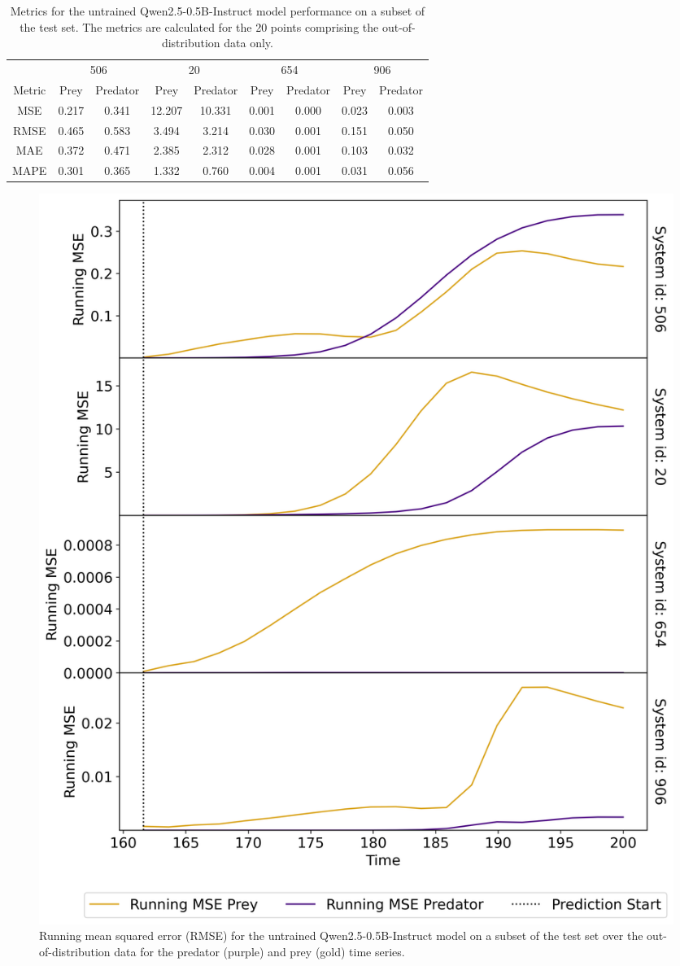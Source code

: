 \documentclass[11pt,a4paper]{article}
\begin{document}
\begin{table}[h]
    \centering
    \begin{tabular}{c|c|c|c|c|c|c|c|c}
        & \multicolumn{2}{c|}{506} & \multicolumn{2}{c|}{20} & \multicolumn{2}{c|}{654} & \multicolumn{2}{|c}{906} \\
        Metric & Prey & Predator & Prey & Predator & Prey & Predator & Prey & Predator \\
        \hline
        MSE & 0.217 & 0.341 & 12.207 & 10.331 & 0.001 & 0.000 & 0.023 & 0.003 \\
        RMSE & 0.465 & 0.583 & 3.494 & 3.214 & 0.030 & 0.001 & 0.151 & 0.050 \\
        MAE & 0.372 & 0.471 & 2.385 & 2.312 & 0.028 & 0.001 & 0.103 & 0.032 \\
        MAPE & 0.301 & 0.365 & 1.332 & 0.760 & 0.004 & 0.001 & 0.031 & 0.056 \\
    \end{tabular}
    \caption{Metrics for the untrained Qwen2.5-0.5B-Instruct model performance on a subset of the test set. The metrics are calculated for the 20 points comprising the out-of-distribution data only.}
    \label{tab:baseline}
\end{table}

\begin{figure}
    \centering
    \includegraphics[width=\columnwidth, keepaspectratio]{../plots/running_mse_example.png}
    \caption{Running mean squared error (RMSE) for the untrained Qwen2.5-0.5B-Instruct model on a subset of the test set over the out-of-distribution data for the predator (purple) and prey (gold) time series.}
    \label{fig:baseline_rmse}
\end{figure}
\end{document}
